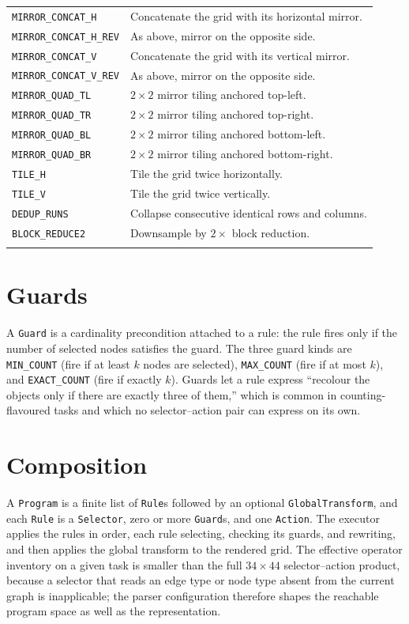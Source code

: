 \begin{table}[htbp]
\begin{tabular}{p{5.4cm}p{7.6cm}}
\texttt{MIRROR\_CONCAT\_H} & Concatenate the grid with its horizontal mirror. \\
\texttt{MIRROR\_CONCAT\_H\_REV} & As above, mirror on the opposite side. \\
\texttt{MIRROR\_CONCAT\_V} & Concatenate the grid with its vertical mirror. \\
\texttt{MIRROR\_CONCAT\_V\_REV} & As above, mirror on the opposite side. \\
\texttt{MIRROR\_QUAD\_TL} & $2\times2$ mirror tiling anchored top-left. \\
\texttt{MIRROR\_QUAD\_TR} & $2\times2$ mirror tiling anchored top-right. \\
\texttt{MIRROR\_QUAD\_BL} & $2\times2$ mirror tiling anchored bottom-left. \\
\texttt{MIRROR\_QUAD\_BR} & $2\times2$ mirror tiling anchored bottom-right. \\
\texttt{TILE\_H} & Tile the grid twice horizontally. \\
\texttt{TILE\_V} & Tile the grid twice vertically. \\
\texttt{DEDUP\_RUNS} & Collapse consecutive identical rows and columns. \\
\texttt{BLOCK\_REDUCE2} & Downsample by $2\times$ block reduction. \\
\noalign{\smallskip}\hline
\end{tabular}
\end{table}

\section{Guards}
\label{app:guards}

A \texttt{Guard} is a cardinality precondition attached to a rule: the rule fires only if
the number of selected nodes satisfies the guard. The three guard kinds are
\texttt{MIN\_COUNT} (fire if at least $k$ nodes are selected), \texttt{MAX\_COUNT} (fire
if at most $k$), and \texttt{EXACT\_COUNT} (fire if exactly $k$). Guards let a rule express
``recolour the objects only if there are exactly three of them,'' which is common in
counting-flavoured tasks and which no selector--action pair can express on its own.

\section{Composition}
\label{app:composition}

A \texttt{Program} is a finite list of \texttt{Rule}s followed by an optional
\texttt{GlobalTransform}, and each \texttt{Rule} is a \texttt{Selector}, zero or more
\texttt{Guard}s, and one \texttt{Action}. The executor applies the rules in order, each
rule selecting, checking its guards, and rewriting, and then applies the global transform to
the rendered grid. The effective operator inventory on a given task is smaller than the
full $34 \times 44$ selector--action product, because a selector that reads an edge type
or node type absent from the current graph is inapplicable; the parser
configuration therefore shapes the reachable program space as well as the representation.

